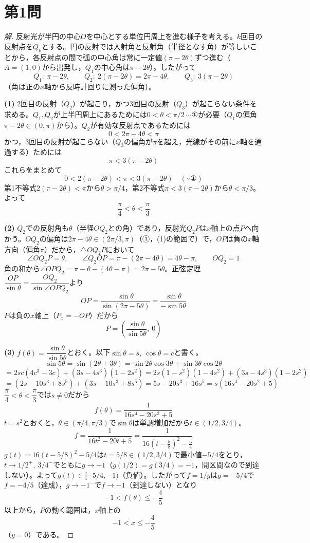 \documentclass[../main.tex]{subfiles}
\begin{document}
\section*{第1問}

\begin{proof}[解]
  反射光が半円の中心$O$を中心とする単位円周上を進む様子を考える。$k$回目の反射点を$Q_k$とする。円の反射では入射角と反射角（半径となす角）が等しいことから，各反射点の間で弧の中心角は常に一定値$(\pi-2\theta)$ずつ進む（$A=(1,0)$から出発し，$Q_1$の中心角は$\pi-2\theta$）。したがって
  \[
    Q_1:\ \pi-2\theta,\qquad Q_2:\ 2(\pi-2\theta)=2\pi-4\theta,\qquad Q_3:\ 3(\pi-2\theta)
  \]
  （角は正の$x$軸から反時計回りに測った偏角）。

  \textbf{(1)} 2回目の反射（$Q_2$）が起こり，かつ3回目の反射（$Q_3$）が起こらない条件を求める。$Q_1,Q_2$が上半円周上にあるためには$0<\theta<\pi/2\ \cdots\text{①}$が必要（$Q_1$の偏角$\pi-2\theta\in(0,\pi)$から）。$Q_2$が有効な反射点であるためには
  \[
    0<2\pi-4\theta<\pi
  \]
  かつ，3回目の反射が起こらない（$Q_3$の偏角が$\pi$を超え，光線がその前に$x$軸を通過する）ためには
  \[
    \pi<3(\pi-2\theta)
  \]
  これらをまとめて
  \[
    0<2(\pi-2\theta)<\pi<3(\pi-2\theta) \quad(\because\text{①})
  \]
  第1不等式$2(\pi-2\theta)<\pi$から$\theta>\pi/4$，第2不等式$\pi<3(\pi-2\theta)$から$\theta<\pi/3$。よって
  \[
    \frac\pi4<\theta<\frac\pi3
  \]

  \textbf{(2)} $Q_2$での反射角も$\theta$（半径$OQ_2$との角）であり，反射光$Q_2P$は$x$軸上の点$P$へ向かう。$OQ_2$の偏角は$2\pi-4\theta\in(2\pi/3,\pi)$（①，(1)の範囲で）で，$OP$は負の$x$軸方向（偏角$\pi$）だから，$\triangle OQ_2P$において
  \[
    \angle OQ_2P=\theta,\qquad \angle Q_2OP=\pi-(2\pi-4\theta)=4\theta-\pi,\qquad OQ_2=1
  \]
  角の和から$\angle OPQ_2=\pi-\theta-(4\theta-\pi)=2\pi-5\theta$。正弦定理$\dfrac{OP}{\sin\theta}=\dfrac{OQ_2}{\sin\angle OPQ_2}$より
  \[
    OP=\frac{\sin\theta}{\sin(2\pi-5\theta)}=\frac{\sin\theta}{-\sin5\theta}
  \]
  $P$は負の$x$軸上（$P_x=-OP$）だから
  \[
    P=\left(\frac{\sin\theta}{\sin5\theta},\ 0\right)
  \]

  \textbf{(3)} $f(\theta)=\dfrac{\sin\theta}{\sin5\theta}$とおく。以下$\sin\theta=s,\ \cos\theta=c$と書く。
  \[
    \sin5\theta=\sin(2\theta+3\theta)=\sin2\theta\cos3\theta+\sin3\theta\cos2\theta
  \]
  \[
    =2sc(4c^3-3c)+(3s-4s^3)(1-2s^2)=2s(1-s^2)(1-4s^2)+(3s-4s^3)(1-2s^2)
  \]
  \[
    =(2s-10s^3+8s^5)+(3s-10s^3+8s^5)=5s-20s^3+16s^5=s(16s^4-20s^2+5)
  \]
  $\dfrac\pi4<\theta<\dfrac\pi3$では$s\ne0$だから
  \[
    f(\theta)=\frac1{16s^4-20s^2+5}
  \]
  $t=s^2$とおくと，$\theta\in(\pi/4,\pi/3)$で$\sin\theta$は単調増加だから$t\in(1/2,3/4)$。
  \[
    f=\frac1{16t^2-20t+5}=\frac1{16\left(t-\frac58\right)^2-\frac54}
  \]
  $g(t)=16(t-5/8)^2-5/4$は$t=5/8\in(1/2,3/4)$で最小値$-5/4$をとり，$t\to1/2^+,\ 3/4^-$でともに$g\to-1$（$g(1/2)=g(3/4)=-1$，開区間なので到達しない）。よって$g(t)\in[-5/4,-1)$（負値）。したがって$f=1/g$は$g=-5/4$で$f=-4/5$（達成），$g\to-1^-$で$f\to-1$（到達しない）となり
  \[
    -1<f(\theta)\le-\frac45
  \]
  以上から，$P$の動く範囲は，$x$軸上の
  \[
    -1<x\le-\frac45
  \]
  （$y=0$）である。
\end{proof}
\end{document}
